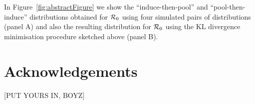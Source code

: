 \documentclass[11pt]{article}
\begin{document}
In Figure~\ref{fig:abstractFigure} we show the ``induce-then-pool'' and 
``pool-then-induce'' distributions obtained for ${\cal R}_0$ using four 
simulated pairs of distributions (panel A) and also the resulting distribution 
for ${\cal R}_0$ using the KL divergence minimisation procedure sketched above 
(panel B).

\section*{Acknowledgements}
[PUT YOURS IN, BOYZ]


\begin{figure}
\hfill
{}
\hfill

\end{figure}
\end{document}
